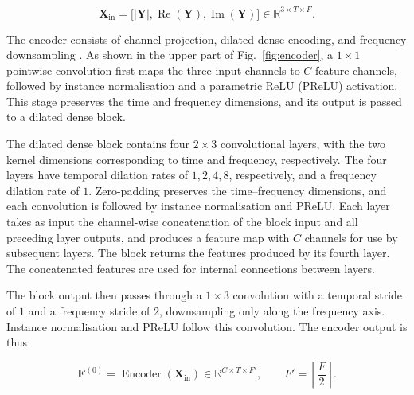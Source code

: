 \documentclass[a4paper,fleqn]{cas-sc}
\begin{document}


\begin{equation}
\mathbf X_{\mathrm{in}}
=
\bigl[
|\mathbf Y|,
\operatorname{Re}(\mathbf Y),
\operatorname{Im}(\mathbf Y)
\bigr]
\in\mathbb R^{3\times T\times F}. \tag{6}\label{eq:encoder_input}
\end{equation}



The encoder consists of channel projection, dilated dense encoding, and frequency downsampling \citep{cao2022cmgan}. As shown in the upper part of Fig.~\ref{fig:encoder}, a $1\times1$ pointwise convolution first maps the three input channels to $C$ feature channels, followed by instance normalisation and a parametric ReLU (PReLU) activation. This stage preserves the time and frequency dimensions, and its output is passed to a dilated dense block.



The dilated dense block contains four $2\times3$ convolutional layers, with the two kernel dimensions corresponding to time and frequency, respectively. The four layers have temporal dilation rates of $1,2,4,8$, respectively, and a frequency dilation rate of $1$. Zero-padding preserves the time--frequency dimensions, and each convolution is followed by instance normalisation and PReLU. Each layer takes as input the channel-wise concatenation of the block input and all preceding layer outputs, and produces a feature map with $C$ channels for use by subsequent layers. The block returns the features produced by its fourth layer. The concatenated features are used for internal connections between layers.



The block output then passes through a $1\times3$ convolution with a temporal stride of $1$ and a frequency stride of $2$, downsampling only along the frequency axis. Instance normalisation and PReLU follow this convolution. The encoder output is thus



\begin{equation}
\mathbf F^{(0)}
=
\operatorname{Encoder}(\mathbf X_{\mathrm{in}})
\in\mathbb R^{C\times T\times F'},
\qquad
F'=\left\lceil\frac F2\right\rceil. \tag{7}\label{eq:encoder_output}
\end{equation}
\end{document}

